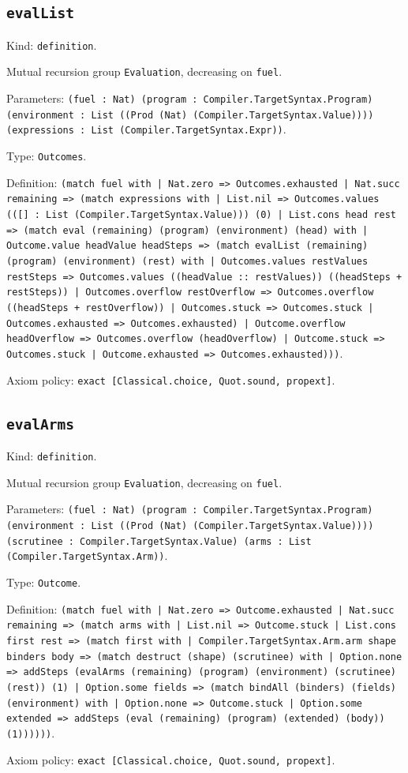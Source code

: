 \documentclass[11pt]{article}
\begin{document}
\subsection*{\texttt{evalList}}
\noindent Kind: \texttt{definition}.\par
\noindent Mutual recursion group \texttt{Evaluation}, decreasing on \texttt{fuel}.\par
\noindent Parameters: \texttt{(fuel : Nat) (program : Compiler.TargetSyntax.Program) (environment : List ((Prod (Nat) (Compiler.TargetSyntax.Value)))) (expressions : List (Compiler.TargetSyntax.Expr))}.\par
\noindent Type: \texttt{Outcomes}.\par
\noindent Definition: \texttt{(match fuel with | Nat.zero => Outcomes.exhausted | Nat.succ remaining => (match expressions with | List.nil => Outcomes.values (([] : List (Compiler.TargetSyntax.Value))) (0) | List.cons head rest => (match eval (remaining) (program) (environment) (head) with | Outcome.value headValue headSteps => (match evalList (remaining) (program) (environment) (rest) with | Outcomes.values restValues restSteps => Outcomes.values ((headValue :: restValues)) ((headSteps + restSteps)) | Outcomes.overflow restOverflow => Outcomes.overflow ((headSteps + restOverflow)) | Outcomes.stuck => Outcomes.stuck | Outcomes.exhausted => Outcomes.exhausted) | Outcome.overflow headOverflow => Outcomes.overflow (headOverflow) | Outcome.stuck => Outcomes.stuck | Outcome.exhausted => Outcomes.exhausted)))}.\par
\noindent Axiom policy: \texttt{exact [Classical.choice, Quot.sound, propext]}.\par
\subsection*{\texttt{evalArms}}
\noindent Kind: \texttt{definition}.\par
\noindent Mutual recursion group \texttt{Evaluation}, decreasing on \texttt{fuel}.\par
\noindent Parameters: \texttt{(fuel : Nat) (program : Compiler.TargetSyntax.Program) (environment : List ((Prod (Nat) (Compiler.TargetSyntax.Value)))) (scrutinee : Compiler.TargetSyntax.Value) (arms : List (Compiler.TargetSyntax.Arm))}.\par
\noindent Type: \texttt{Outcome}.\par
\noindent Definition: \texttt{(match fuel with | Nat.zero => Outcome.exhausted | Nat.succ remaining => (match arms with | List.nil => Outcome.stuck | List.cons first rest => (match first with | Compiler.TargetSyntax.Arm.arm shape binders body => (match destruct (shape) (scrutinee) with | Option.none => addSteps (evalArms (remaining) (program) (environment) (scrutinee) (rest)) (1) | Option.some fields => (match bindAll (binders) (fields) (environment) with | Option.none => Outcome.stuck | Option.some extended => addSteps (eval (remaining) (program) (extended) (body)) (1))))))}.\par
\noindent Axiom policy: \texttt{exact [Classical.choice, Quot.sound, propext]}.\par
\end{document}
